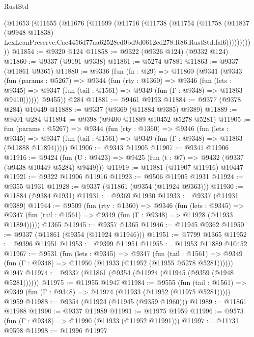 \begin{lexlean}{RustStd}
\begin{coremodule}
        (@11653
          (@11655
            (@11676
              (@11699
                (@11716
                  (@11738
                    (@11754
                      (@11758
                        (@11837
                          (@9948 @11838)
                          LexLeanPreserve.Cae4456d77aa62528ed0bd9d0612cd278.R86.RustStd.fal6)))))))))))
@11854 := @9320 @124
@11858 := @9322 (@9326 @124) (@9332 @124)
@11860 := @9337 (@9191 @9338)
@11861 := @5274 @7881
@11863 := @9337 (@11861 @9365)
@11880 := @9336
    (fun (fn : @29) =>
    @11860
      (@9341
        (@9343
          (fun (params : @5267) =>
          @9344
            (fun (rty : @1360) =>
            @9346
              (fun (lets : @9345) =>
              @9347 (fun (tail : @1561) => @9349 (fun (Γ : @9348) => @11863 @9410))))))
        @9455))
    @284
@11881 := @9461 @9193
@11884 := @9377 (@9378 @284) @10449
@11888 := @9337 (@9369 (@11884 @9385) @9389)
@11889 := @9401 @284
@11894 := @9398 (@9400 @11889 @10452 @5278 @5281)
@11905 := fun (params : @5267) =>
  @9344
    (fun (rty : @1360) =>
    @9346
      (fun (lets : @9345) =>
      @9347 (fun (tail : @1561) => @9349 (fun (Γ : @9348) => @11863 (@11888 @11894)))))
@11906 := @9343 @11905
@11907 := @9341 @11906
@11916 := @9424
    (fun (U : @9423) => @9425 (fun (t : @7) => @9432 (@9337 (@9438 @10449 @5284) @9449)))
@11919 := @11881 (@11907 @11916) @10447
@11921 := @9322 @11906 @11916
@11923 := @9506 @11905 @1931
@11924 := @9355 @1931
@11928 := @9337 (@11861 (@9354 (@11924 @9363)))
@11930 := @11884 (@9384 @1931)
@11931 := @9369 @11930
@11933 := @9337 (@11931 @9389)
@11944 := @9509
    (fun (rty : @1360) =>
    @9346
      (fun (lets : @9345) =>
      @9347 (fun (tail : @1561) => @9349 (fun (Γ : @9348) => @11928 (@11933 @11894)))))
    @1365
@11945 := @9357 @1365
@11946 := @11945 @9362
@11950 := @9337 (@11861 (@9354 (@11924 @11946)))
@11951 := @7799 @1365
@11952 := @9396 @11951
@11953 := @9399 @11951
@11955 := @11953 @11889 @10452
@11967 := @9531
    (fun (lets : @9345) =>
    @9347
      (fun (tail : @1561) =>
      @9349 (fun (Γ : @9348) => @11950 (@11933 (@11952 (@11955 @5278 @5281))))))
    @1947
@11974 := @9337 (@11861 (@9354 (@11924 (@11945 (@9359 (@1948 @5281))))))
@11975 := @11955 @1947
@11984 := @9555
    (fun (tail : @1561) => @9349 (fun (Γ : @9348) => @11974 (@11933 (@11952 (@11975 @5281)))))
    @1959
@11988 := @9354 (@11924 (@11945 (@9359 @1960)))
@11989 := @11861 @11988
@11990 := @9337 @11989
@11991 := @11975 @1959
@11996 := @9573 (fun (Γ : @9348) => @11990 (@11933 (@11952 @11991)))
@11997 := @11731 @9598
@11998 := @11996 @11997

\end{coremodule}
\end{lexlean}
